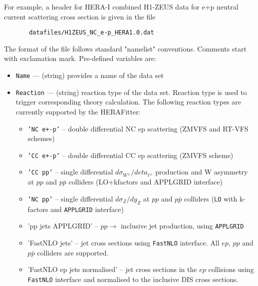    For example, a header for HERA-I combined H1-ZEUS data for e+p neutral 
   current scattering cross section is given in the file

\begin{verbatim}
       datafiles/H1ZEUS_NC_e-p_HERA1.0.dat
\end{verbatim}

   The format of the file follows standard "namelist" conventions. Comments 
   start with exclamation mark.  Pre-defined variables are:
\begin{itemize}
     \item{\tt Name}        --- (string) provides a name of the data set
    \item{\tt  Reaction}    --- (string) reaction type of the data set. Reaction type is used 
                      to trigger corresponding theory calculation. The following 
                      reaction types  are currently supported by the HERAFitter:
                      \begin{itemize}
                        \item {\tt 'NC e+-p'}  -- double differential NC ep scattering
                                      (ZMVFS and RT-VFS schemes) 
                        \item {\tt 'CC e+-p'}  -- double differential CC ep scattering
                                      (ZMVFS scheme)
                        \item {\tt 'CC pp'}    -- single differential $d \sigma_{W^{\pm}}/d eta_{\ell^{\pm}}$
                                      production and W asymmetry at $pp$ and $p\bar{p}$ 
                                      colliders (LO+kfactors and APPLGRID interface)
                        \item {\tt 'NC pp'}    -- single differential $d \sigma_Z / d y_Z$ at $pp$ and
                                      $p\bar{p}$ colliders
                                      ({\tt LO} with k-factors and {\tt APPLGRID} interface)

                        \item 'pp jets APPLGRID' -- $pp\to$ inclusive jet production, using
                                     {\tt APPLGRID}

                        \item 'FastNLO jets' -- jet cross sections using {\tt FastNLO} interface.
                                     All $ep$, $pp$ and $p\bar{p}$ colliders are supported.

                        \item 'FastNLO ep jets normalised' -- jet cross sections in the $ep$ collisions 
                                     using {\tt FastNLO} interface and normalised to the inclusive DIS cross sections.


\end{itemize}
\end{itemize}
